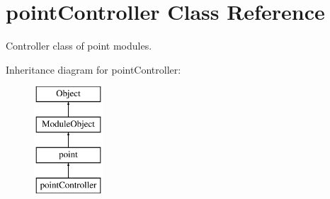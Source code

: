 \hypertarget{classpointController}{\section{point\-Controller Class Reference}
\label{classpointController}
}


Controller class of point modules.  


Inheritance diagram for point\-Controller\-:\begin{figure}[H]
\begin{center}
\leavevmode
\includegraphics[height=4.000000cm]{classpointController}
\end{center}
\end{figure}
